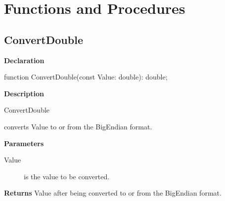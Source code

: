 \documentclass{report}
\begin{document}
\section{Functions and Procedures}
\subsection*{ConvertDouble}
\begin{list}{}{
\setlength{\itemindent}{0cm}
\setlength{\listparindent}{0cm}
\setlength{\leftmargin}{\evensidemargin}
\addtolength{\leftmargin}{\tmplength}
\settowidth{\labelsep}{X}
\addtolength{\leftmargin}{\labelsep}
\setlength{\labelwidth}{\tmplength}
}
\begin{flushleft}
\item[\textbf{Declaration}\hfill]
\begin{ttfamily}
function ConvertDouble(const Value: double): double;\end{ttfamily}


\end{flushleft}
\par
\item[\textbf{Description}]
\begin{ttfamily}ConvertDouble\end{ttfamily} converts Value to or from the BigEndian format.\hfill\vspace*{1ex}

  \par
\item[\textbf{Parameters}]
\begin{description}
\item[Value] is the value to be converted.
\end{description}
\item[\textbf{Returns}]Value after being converted to or from the BigEndian format.


\end{list}
\end{document}
